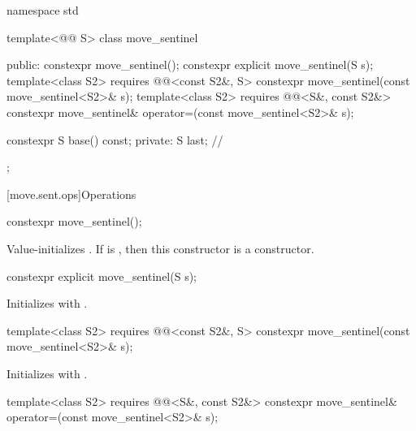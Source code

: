 %
\begin{codeblock}
namespace std {
  template<@@ S>
  class move_sentinel {
  public:
    constexpr move_sentinel();
    constexpr explicit move_sentinel(S s);
    template<class S2>
      requires @@<const S2&, S>
        constexpr move_sentinel(const move_sentinel<S2>& s);
    template<class S2>
      requires @@<S&, const S2&>
        constexpr move_sentinel& operator=(const move_sentinel<S2>& s);

    constexpr S base() const;
  private:
    S last;     // \expos
  };
}
\end{codeblock}

[move.sent.ops]{Operations}

%
\begin{itemdecl}
constexpr move_sentinel();
\end{itemdecl}

\begin{itemdescr}
\pnum
\effects
Value-initializes .
If  is ,
then this constructor is a  constructor.
\end{itemdescr}

%
\begin{itemdecl}
constexpr explicit move_sentinel(S s);
\end{itemdecl}

\begin{itemdescr}
\pnum
\effects
Initializes  with .
\end{itemdescr}

%
\begin{itemdecl}
template<class S2>
  requires @@<const S2&, S>
    constexpr move_sentinel(const move_sentinel<S2>& s);
\end{itemdecl}

\begin{itemdescr}
\pnum
\effects
Initializes  with .
\end{itemdescr}

%
%
\begin{itemdecl}
template<class S2>
  requires @@<S&, const S2&>
    constexpr move_sentinel& operator=(const move_sentinel<S2>& s);
\end{itemdecl}

